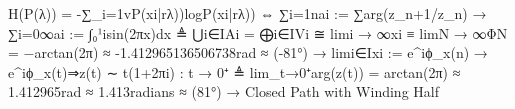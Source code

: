 H(P(λ)) = -∑_i=1vP(xi|rλ))logP(xi|rλ)) ⇔ ∑i=1nai := ∑arg(z_{n+1}/z_n) → ∑i=0∞ai := ∫₀¹isin(2πx)dx ≜ ⋃i∈IAi = ⨁i∈IVi ≅ lim⁡i → ∞xi ≡ lim⁡N → ∞ΦN = −arctan⁡(2π) ≈ -1.412965136506738rad ≈ (-81°) → lim⁡i∈Ixi := e^{iϕ_x(n)} → e^{iϕ_x(t)}⇒z(t) ∼ t(1+2πi) : t → 0⁺ ≜ lim_{t→0⁺}arg(z(t)) = arctan(2π) ≈ 1.412965rad ≈ 1.413radians ≈ (81°) → Closed Path with Winding Half
